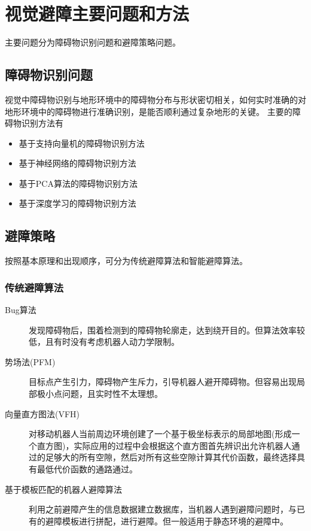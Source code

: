\documentclass[a4paper]{article}
\begin{document}
	\section{视觉避障主要问题和方法}
	主要问题分为障碍物识别问题和避障策略问题。
	\subsection{障碍物识别问题}
	视觉中障碍物识别与地形环境中的障碍物分布与形状密切相关，如何实时准确的对地形环境中的障碍物进行准确识别，是能否顺利通过复杂地形的关键。
	主要的障碍物识别方法有
	\begin{itemize}
		\item 基于支持向量机的障碍物识别方法
		\item 基于神经网络的障碍物识别方法
		\item 基于PCA算法的障碍物识别方法
		\item 基于深度学习的障碍物识别方法
	\end{itemize}
	
	\subsection{避障策略}
	按照基本原理和出现顺序，可分为传统避障算法和智能避障算法。
	
	\subsubsection{传统避障算法}
	\begin{description}
		\item[Bug算法] 发现障碍物后，围着检测到的障碍物轮廓走，达到绕开目的。但算法效率较低，且有时没有考虑机器人动力学限制。
		\item[势场法(PFM)] 目标点产生引力，障碍物产生斥力，引导机器人避开障碍物。但容易出现局部极小点问题，且实时性不太理想。
		\item[向量直方图法(VFH)] 对移动机器人当前周边环境创建了一个基于极坐标表示的局部地图(形成一个直方图)，实际应用的过程中会根据这个直方图首先辨识出允许机器人通过的足够大的所有空隙，然后对所有这些空隙计算其代价函数，最终选择具有最低代价函数的通路通过。
		\item[基于模板匹配的机器人避障算法] 利用之前避障产生的信息数据建立数据库，当机器人遇到避障问题时，与已有的避障模板进行拼配，进行避障。但一般适用于静态环境的避障中。
	\end{description}
		
\end{document}
